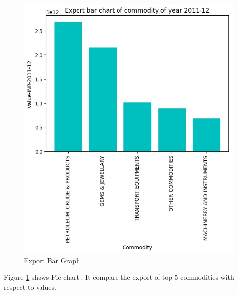 \documentclass[a4paper,11pt]{article}
\begin{document}
\begin{figure}[H]
\centering
\includegraphics[scale=0.70,width=\textwidth]{image4.jpg}
  \caption{Export Bar Graph}
  \label{fig:bar2}
  
\end{figure}

Figure \ref{fig:bar2} shows Pie chart . It compare the export of top 5  commodities with respect to values.
\end{document}
